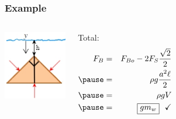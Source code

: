 \documentclass[]{beamer}
\begin{document}
        \begin{frame}
          \frametitle{Example \theexample}
          
         
          
          \begin{columns}[c]
          
            \begin{center}
              \includegraphics[height=1.2in]{images2/example_12.97c.jpg}
            \end{center}
            
          
            \column{2.5in}
            
             Total:
            \textcolor{mypink1}{
            \begin{eqnarray*}
            F_B&=&F_{Bo}-2F_S\frac{\sqrt{2}}{2}\\
            \pause
            &=&\rho g \frac{a^2 \ell}{2}\\
            \pause
            &=&\rho g V\\
            \pause
            &=&\boxed{g m_w} \ \ \checkmark\\
            \end{eqnarray*}
            }
            \end{columns}

            \end{frame}
\end{document}
